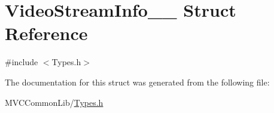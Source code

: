 \hypertarget{struct_video_stream_info____}{
\section{VideoStreamInfo\_\-\_\- Struct Reference}
\label{struct_video_stream_info____}
}


{\ttfamily \#include $<$Types.h$>$}



The documentation for this struct was generated from the following file:\begin{DoxyCompactItemize}
\item 
MVCCommonLib/\hyperlink{_types_8h}{Types.h}\end{DoxyCompactItemize}
